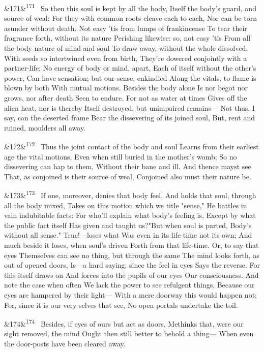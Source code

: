 \documentclass[12pt]{article}
\newcommand{\para}[1][]{\par\noindent\ifx&#1&\else\textsuperscript{\footnotesize #1}~\fi}
\begin{document}
\para[171] So then this soul is kept by all the body, Itself the body's guard, and source of weal: For they with common roots cleave each to each, Nor can be torn asunder without death. Not easy 'tis from lumps of frankincense To tear their fragrance forth, without its nature Perishing likewise: so, not easy 'tis From all the body nature of mind and soul To draw away, without the whole dissolved. With seeds so intertwined even from birth, They're dowered conjointly with a partner-life; No energy of body or mind, apart, Each of itself without the other's power, Can have sensation; but our sense, enkindled Along the vitals, to flame is blown by both With mutual motions. Besides the body alone Is nor begot nor grows, nor after death Seen to endure. For not as water at times Gives off the alien heat, nor is thereby Itself destroyed, but unimpaired remains--- Not thus, I say, can the deserted frame Bear the dissevering of its joined soul, But, rent and ruined, moulders all away.

\para[172] Thus the joint contact of the body and soul Learns from their earliest age the vital motions, Even when still buried in the mother's womb; So no dissevering can hap to them, Without their bane and ill. And thence mayst see That, as conjoined is their source of weal, Conjoined also must their nature be.

\para[173] If one, moreover, denies that body feel, And holds that soul, through all the body mixed, Takes on this motion which we title "sense," He battles in vain indubitable facts: For who'll explain what body's feeling is, Except by what the public fact itself Has given and taught us?"But when soul is parted, Body's without all sense." True!---loses what Was even in its life-time not its own; And much beside it loses, when soul's driven Forth from that life-time. Or, to say that eyes Themselves can see no thing, but through the same The mind looks forth, as out of opened doors, Is---a hard saying; since the feel in eyes Says the reverse. For this itself draws on And forces into the pupils of our eyes Our consciousness. And note the case when often We lack the power to see refulgent things, Because our eyes are hampered by their light--- With a mere doorway this would happen not; For, since it is our very selves that see, No open portals undertake the toil.

\para[174] Besides, if eyes of ours but act as doors, Methinks that, were our sight removed, the mind Ought then still better to behold a thing--- When even the door-posts have been cleared away.
\end{document}
